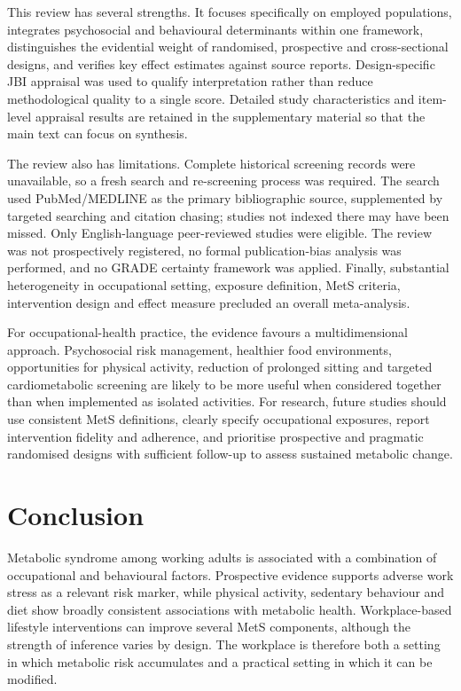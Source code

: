 \documentclass[11pt]{article}
\begin{document}
This review has several strengths. It focuses specifically on employed populations, integrates psychosocial and behavioural determinants within one framework, distinguishes the evidential weight of randomised, prospective and cross-sectional designs, and verifies key effect estimates against source reports. Design-specific JBI appraisal was used to qualify interpretation rather than reduce methodological quality to a single score. Detailed study characteristics and item-level appraisal results are retained in the supplementary material so that the main text can focus on synthesis.

The review also has limitations. Complete historical screening records were unavailable, so a fresh search and re-screening process was required. The search used PubMed/MEDLINE as the primary bibliographic source, supplemented by targeted searching and citation chasing; studies not indexed there may have been missed. Only English-language peer-reviewed studies were eligible. The review was not prospectively registered, no formal publication-bias analysis was performed, and no GRADE certainty framework was applied. Finally, substantial heterogeneity in occupational setting, exposure definition, MetS criteria, intervention design and effect measure precluded an overall meta-analysis.

For occupational-health practice, the evidence favours a multidimensional approach. Psychosocial risk management, healthier food environments, opportunities for physical activity, reduction of prolonged sitting and targeted cardiometabolic screening are likely to be more useful when considered together than when implemented as isolated activities. For research, future studies should use consistent MetS definitions, clearly specify occupational exposures, report intervention fidelity and adherence, and prioritise prospective and pragmatic randomised designs with sufficient follow-up to assess sustained metabolic change.

\section{Conclusion}

Metabolic syndrome among working adults is associated with a combination of occupational and behavioural factors. Prospective evidence supports adverse work stress as a relevant risk marker, while physical activity, sedentary behaviour and diet show broadly consistent associations with metabolic health. Workplace-based lifestyle interventions can improve several MetS components, although the strength of inference varies by design. The workplace is therefore both a setting in which metabolic risk accumulates and a practical setting in which it can be modified.
\end{document}
